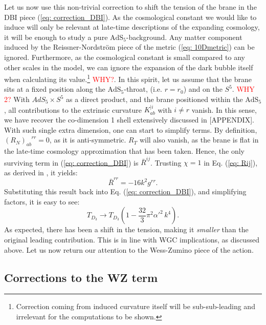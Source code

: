 Let us now use this non-trivial correction to shift the tension of the brane in the DBI piece (\ref{eq: correction_DBI}). As the cosmological constant we would like to induce will only be relevant at late-time descriptions of the expanding cosmology, it will be enough to study a pure $\text{AdS}_5$-background. Any matter component induced by the Reissner-Nordström piece of the metric (\ref{eq: 10Dmetric}) can be ignored. Furthermore, as the cosmological constant is small compared to any other scales in the model, we can ignore the expansion of the dark bubble itself when calculating its value.\footnote{Correction coming from induced curvature itself will be sub-sub-leading and irrelevant for the computations to be shown.} \textcolor{red}{WHY?}. In this spirit, let us assume that the brane sits at a fixed position along the $\text{AdS}_{5}$-throat, (i.e. $r=r_0$) and on the $S^5$. \textcolor{red}{WHY 2?} With $AdS_5 \times S^5$ as a direct product, and the brane positioned within the $\text{AdS}_5$, all contributions to the extrinsic curvature $K_{ab}^{|i}$ with $i\neq r$ vanish. In this sense, we have recover the co-dimension 1 shell extensively discussed in [APPENDIX]. With such single extra dimension, one can start to simplify terms.  By definition, $(R_N)_{ab}^{\quad rr}=0$, as it is anti-symmetric. $R_T$ will also vanish, as the brane is flat in the late-time cosmology approximation that has been taken. Hence, the only surviving term in (\ref{eq: correction_DBI}) is $ \bar{R}^{ij}$. Trusting $\chi=1$ in Eq. (\ref{eq: Rij}), as derived in \cite{Jalali:2015aa}, it yields:
\begin{equation}
    \bar{R}^{rr} = -16 k^2 g^{rr} .
\end{equation}
Substituting this result back into Eq. (\ref{eq: correction_DBI}), and simplifying factors, it is easy to see:
\begin{equation}\label{eq: tension_shift}
    T_{D_{3}} \rightarrow T_{D_{3}} \left(1-\frac{32}{3} \pi^2 \alpha '^2 \, k^4 \right).
\end{equation}
As expected, there has been a shift in the tension, making it \textit{smaller} than the original leading contribution. This is in line with WGC implications, as discussed above. Let us now return our attention to the Wess-Zumino piece of the action.

\subsection*{Corrections to the WZ term}

